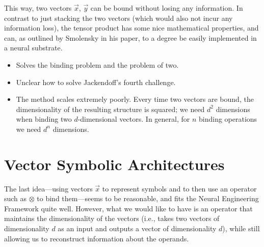 \documentclass[10pt,letterpaper,oneside]{article}
\begin{document}
This way, two vectors $\vec x$, $\vec y$ can be bound without losing any information. In contrast to just stacking the two vectors (which would also not incur any information loss), the tensor product has some nice mathematical properties, and can, as outlined by Smolensky in his paper, to a degree be easily implemented in a neural substrate.
\begin{itemize}
	\item[\OPlus] Solves the binding problem and the problem of two.
	\item[\OMeh] Unclear how to solve Jackendoff's fourth challenge.
	\item[\OMinus] The method scales extremely poorly. Every time two vectors are bound, the dimensionality of the resulting structure is squared; we need $d^2$ dimensions when binding two $d$-dimensional vectors. In general, for $n$ binding operations we need $d^n$ dimensions.
\end{itemize}


\section{Vector Symbolic Architectures}

The last idea---using vectors $\vec x$ to represent symbols and to then use an operator such as $\otimes$ to bind them---seems to be reasonable, and fits the Neural Engineering Framework quite well. However, what we would like to have is an operator that maintains the dimensionality of the vectors (i.e., takes two vectors of dimensionality $d$ as an input and outputs a vector of dimensionality $d$), while still allowing us to reconstruct information about the operands.
\end{document}
